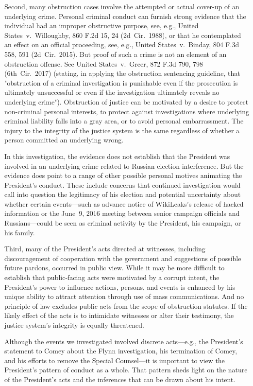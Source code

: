 Second, many obstruction cases involve the attempted or actual cover-up of an underlying crime.
Personal criminal conduct can furnish strong evidence that the individual had an improper obstructive purpose, see, e.g., United States~v.\ Willoughby, 860 F.2d 15, 24 (2d~Cir.~1988), or that he contemplated an effect on an official proceeding, see, e.g., United States~v.\ Binday, 804 F.3d 558, 591 (2d~Cir.~2015).
But proof of such a crime is not an element of an obstruction offense.
See United States~v.\ Greer, 872 F.3d 790, 798 (6th~Cir.~2017) (stating, in applying the obstruction sentencing guideline, that "obstruction of a criminal investigation is punishable even if the prosecution is ultimately unsuccessful or even if the investigation ultimately reveals no underlying crime").
Obstruction of justice can be motivated by a desire to protect non-criminal personal interests, to protect against investigations where underlying criminal liability falls into a gray area, or to avoid personal embarrassment.
The injury to the integrity of the justice system is the same regardless of whether a person committed an underlying wrong.

In this investigation, the evidence does not establish that the President was involved in an underlying crime related to Russian election interference.
But the evidence does point to a range of other possible personal motives animating the President's conduct.
These include concerns that continued investigation would call into question the legitimacy of his election and potential uncertainty about whether certain events---such as advance notice of WikiLeaks's release of hacked information or the June~9, 2016 meeting between senior campaign officials and Russians---could be seen as criminal activity by the President, his campaign, or his family.

Third, many of the President's acts directed at witnesses, including discouragement of cooperation with the government and suggestions of possible future pardons, occurred in public view.
While it may be more difficult to establish that public-facing acts were motivated by a corrupt intent, the President's power to influence actions, persons, and events is enhanced by his unique ability to attract attention through use of mass communications.
And no principle of law excludes public acts from the scope of obstruction statutes.
If the likely effect of the acts is to intimidate witnesses or alter their testimony, the justice system's integrity is equally threatened.

Although the events we investigated involved discrete acts---e.g., the President's statement to Comey about the Flynn investigation, his termination of Comey, and his efforts to remove the Special Counsel---it is important to view the President's pattern of conduct as a whole.
That pattern sheds light on the nature of the President's acts and the inferences that can be drawn about his intent.

